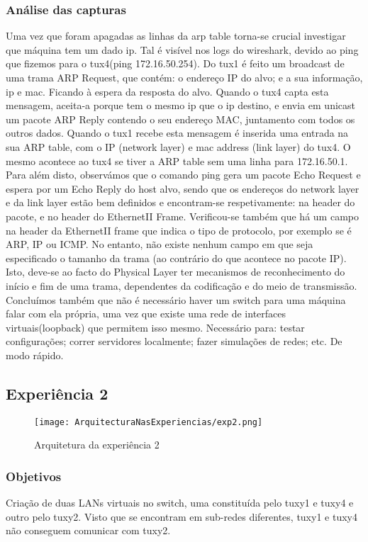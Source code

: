 \documentclass[a4paper]{article}
\begin{document}
\subsubsection{Análise das capturas}
Uma vez que foram apagadas as linhas da arp table torna-se crucial investigar
que máquina tem um dado ip. Tal é visível nos logs do wireshark, devido ao ping
que fizemos para o tux4(ping 172.16.50.254). Do tux1 é feito um broadcast de
uma trama ARP Request, que contém: o endereço IP do alvo; e a sua informação,
ip e mac. Ficando à espera da resposta do alvo. Quando o tux4 capta esta
mensagem, aceita-a porque tem o mesmo ip que o ip destino, e envia em unicast
um pacote ARP Reply contendo o seu endereço MAC, juntamento com todos os outros
dados. Quando o tux1 recebe esta mensagem é inserida uma entrada na sua ARP
table, com o IP (network layer) e mac address (link layer) do tux4. O mesmo
acontece ao tux4 se tiver a ARP table sem uma linha para 172.16.50.1. Para além
disto, observámos que o comando ping gera um pacote Echo Request e espera por
um Echo Reply do host alvo, sendo que os endereços do network layer e da link
layer estão bem definidos e encontram-se respetivamente: na header do pacote, e
no header do EthernetII Frame. Verificou-se também que há um campo na header da
EthernetII frame que indica o tipo de protocolo, por exemplo se é ARP, IP ou
ICMP. No entanto, não existe nenhum campo em que seja especificado o tamanho da
trama (ao contrário do que acontece no pacote IP). Isto, deve-se ao facto do
Physical Layer ter mecanismos de reconhecimento do início e fim de uma trama,
dependentes da codificação e do meio de transmissão. Concluímos também que não
é necessário haver um switch para uma máquina falar com ela própria, uma vez
que existe uma rede de interfaces virtuais(loopback) que permitem isso mesmo.
Necessário para: testar configurações; correr servidores localmente; fazer
simulações de redes; etc. De modo rápido.

\subsection{Experiência 2}

\begin{figure}[h]
    \centering
    \texttt{[image: ArquitecturaNasExperiencias/exp2.png]}
    \caption{Arquitetura da experiência 2}
\end{figure}

\subsubsection{Objetivos}
Criação de duas LANs virtuais no switch, uma constituída pelo tuxy1 e tuxy4 e outro pelo tuxy2.
Visto que se encontram em sub-redes diferentes, tuxy1 e tuxy4 não conseguem comunicar com tuxy2.
\end{document}
